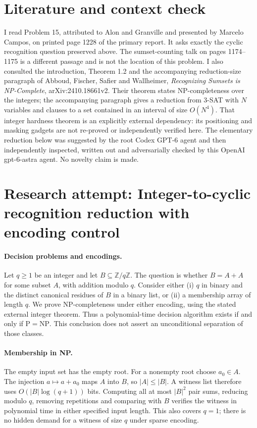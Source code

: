 \documentclass[11pt]{article}
\begin{document}
\section{Literature and context check}

I read Problem 15, attributed to Alon and Granville and presented by Marcelo Campos,
on printed page 1228 of the primary report. It asks exactly the cyclic recognition
question preserved above. The sumset-counting talk on pages 1174--1175 is a different
passage and is not the location of this problem.
I also consulted the introduction, Theorem 1.2 and the accompanying reduction-size
paragraph of Abboud, Fischer, Safier and Wallheimer, \emph{Recognizing Sumsets is
NP-Complete}, arXiv:2410.18661v2. Their theorem states NP-completeness over the
integers; the accompanying paragraph gives a reduction from 3-SAT with $N$
variables and clauses to a set contained in an interval of size $O(N^4)$.
That integer hardness theorem is an explicitly external dependency: its positioning
and masking gadgets are not re-proved or independently verified here.
The elementary reduction below was suggested by the root Codex GPT-6 agent and
then independently inspected, written out and adversarially checked by this
OpenAI gpt-6-astra agent. No novelty claim is made.

\section{Research attempt: Integer-to-cyclic recognition reduction with encoding control}

\paragraph{Decision problems and encodings.}
Let $q\geq1$ be an integer and let $B\subseteq\mathbb Z/q\mathbb Z$.
The question is whether $B=A+A$ for some subset $A$, with addition modulo $q$.
Consider either (i) $q$ in binary and the distinct canonical residues of $B$ in a
binary list, or (ii) a membership array of length $q$. We prove NP-completeness
under either encoding, using the stated external integer theorem. Thus a
polynomial-time decision algorithm exists if and only if $\mathrm P=\mathrm{NP}$.
This conclusion does not assert an unconditional separation of those classes.

\paragraph{Membership in NP.}
The empty input set has the empty root. For a nonempty root choose $a_0\in A$.
The injection $a\mapsto a+a_0$ maps $A$ into $B$, so $|A|\leq |B|$.
A witness list therefore uses $O(|B|\log(q+1))$ bits. Computing all at most
$|B|^2$ pair sums, reducing modulo $q$, removing repetitions and comparing with
$B$ verifies the witness in polynomial time in either specified input length.
This also covers $q=1$; there is no hidden demand for a witness of size $q$ under
sparse encoding.
\end{document}

